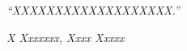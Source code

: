 \chapter*{}
\vfill
\begin{flushright}
\textit{“XXXXXXXXXXXXXXXXXXX.”}
\end{flushright}
\begin{flushright}
\textit{X Xxxxxxx, Xxxx Xxxxx}
\end{flushright}
\vspace{1cm}